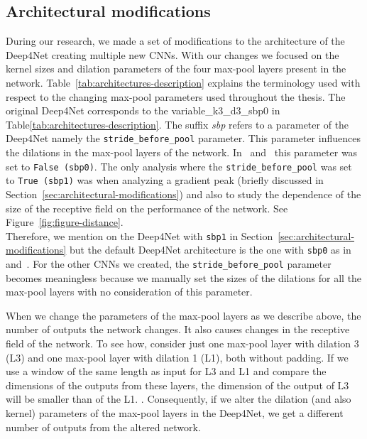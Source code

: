 \subsection{Architectural modifications}\label{subsec:architectural-modifications}
During our research, we made a set of modifications to the architecture of the Deep4Net creating multiple new CNNs.
With our changes we focused on the kernel sizes and dilation parameters of the four max-pool layers present in the network.
Table~\ref{tab:architectures-description} explains the terminology used with respect to the changing max-pool parameters used throughout the thesis.
The original Deep4Net corresponds to the {variable}\_k3\_d3\_sbp0 in Table\ref{tab:architectures-description}.
The suffix \textit{sbp} refers to a parameter of the Deep4Net namely the \texttt{stride\_before\_pool} parameter.
This parameter influences the dilations in the max-pool layers of the network.
In~\cite{Hammer-2021} and~\cite{schirrmeister-deep-2017} this parameter was set to \texttt{False (sbp0)}.
The only analysis where the \texttt{stride\_before\_pool} was set to \texttt{True (sbp1)} was when analyzing a gradient peak (briefly discussed in Section~\ref{sec:architectural-modifications}) and also to study the dependence of the size of the receptive field on the performance of the network.
See Figure~\ref{fig:figure-distance}. \\

Therefore, we mention on the Deep4Net with \texttt{sbp1} in Section~\ref{sec:architectural-modifications} but the default Deep4Net architecture is the one with \texttt{sbp0} as in~\cite{Hammer-2021} and~\cite{schirrmeister-deep-2017}.
For the other CNNs we created, the \texttt{stride\_before\_pool} parameter becomes meaningless because we manually set the sizes of the dilations for all the max-pool layers with no consideration of this parameter.

When we change the parameters of the max-pool layers as we describe above, the number of outputs the network changes.
It also causes changes in the receptive field of the network.
To see how, consider just one max-pool layer with dilation 3 (L3) and one max-pool layer with dilation 1 (L1), both without padding.
If we use a window of the same length as input for L3 and L1 and compare the dimensions of the outputs from these layers, the dimension of the output of L3 will be smaller than of the L1.
.
Consequently, if we alter the dilation (and also kernel) parameters of the max-pool layers in the Deep4Net, we get a different number of outputs from the altered network.

